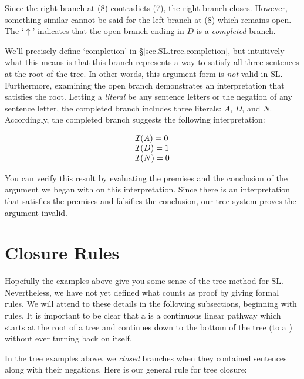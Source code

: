 Since the right branch at (8) contradicts (7), the right branch closes.
However, something similar cannot be said for the left branch at (8) which remains open.
The `$\uparrow$' indicates that the open branch ending in $D$ is a \emph{completed} branch. 

We'll precisely define `completion' in \S\ref{sec.SL.tree.completion}, but intuitively what this means is that this branch represents a way to satisfy all three sentences at the root of the tree.
In other words, this argument form is \emph{not} valid in SL.
Furthermore, examining the open branch demonstrates an interpretation that satisfies the root.
Letting a \textit{literal} be any sentence letters or the negation of any sentence letter, the completed branch includes three literals: \enot $A$, $D$, and \enot $N$.
Accordingly, the completed branch suggests the following interpretation:

\begin{displaymath}
	\begin{array}{ll}
    \mathcal{I}(A) = 0\\
    \mathcal{I}(D) = 1\\
    \mathcal{I}(N) = 0
	\end{array}
\end{displaymath}

You can verify this result by evaluating the premises and the conclusion of the argument we began with on this interpretation. Since there is an interpretation that satisfies the premises and falsifies the conclusion, our tree system proves the argument invalid.





\section{Closure Rules}

Hopefully the examples above give you some sense of the tree method for SL.
Nevertheless, we have not yet defined what counts as proof by giving formal rules. 
We will attend to these details in the following subsections, beginning with  rules.
It is important to be clear that a  is a continuous linear pathway which starts at the root of a tree and continues down to the bottom of the tree (to a ) without ever turning back on itself.

In the tree examples above, we \emph{closed} branches when they contained sentences along with their negations. Here is our general rule for tree closure:

